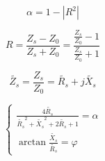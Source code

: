 \begin{equation}
	\alpha = 1 - |R^2|
\end{equation}

\begin{equation}
	R = \frac{Z_s - Z_0}{Z_s + Z_0} = \frac{\frac{Z_s}{Z_0} - 1}{\frac{Z_s}{Z_0} + 1}
\end{equation}

\begin{equation}
	\tilde{Z_s} = \frac{Z_s}{Z_0} = \tilde{R_s} + j\tilde{X_s}
\end{equation}



\begin{equation}
	\begin{cases}
		\frac{4\tilde{R_s}}{\tilde{R_s}^2+\tilde{X_s}^2 + 2\tilde{R_s} + 1} = \alpha\\
		\arctan{\frac{\tilde{X_s}}{\tilde{R_s}}} = \varphi
	\end{cases}	
	\label{eq:impedance}
\end{equation}


